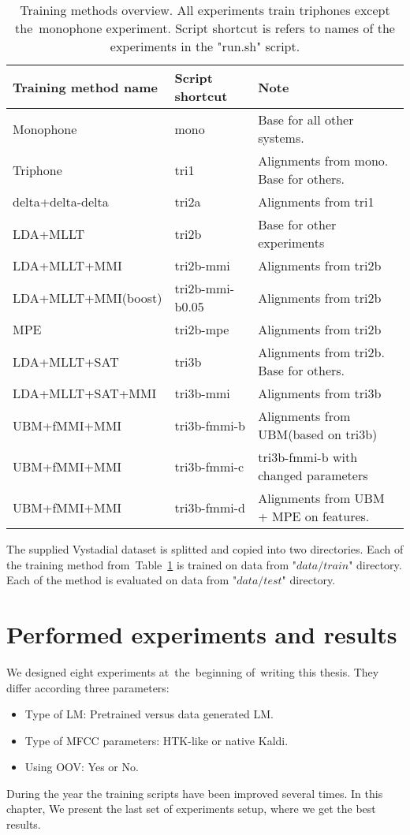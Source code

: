\begin{table}[!htp]\label{tab:disc_train}
\small{\begin{tabular}{lll}
\hline
Training method name & Script shortcut & Note\\
\hline
Monophone & mono & Base for all other systems.\\
Triphone  & tri1 &  Alignments from mono. Base for others.\\
delta+delta-delta & tri2a & Alignments from tri1 \\
\ac{LDA}+\ac{MLLT} & tri2b &  Base for other experiments \\
\ac{LDA}+\ac{MLLT}+\ac{MMI} & tri2b-mmi & Alignments from tri2b \\
\ac{LDA}+\ac{MLLT}+\ac{MMI}(boost) & tri2b-mmi-b0.05  & Alignments from tri2b \\
\ac{MPE} & tri2b-mpe & Alignments from tri2b \\
\ac{LDA}+\ac{MLLT}+\ac{SAT} & tri3b & Alignments from tri2b. Base for others. \\
\ac{LDA}+\ac{MLLT}+\ac{SAT}+\ac{MMI} & tri3b-mmi  & Alignments from tri3b \\
\ac{UBM}+\ac{fMMI}+\ac{MMI} & tri3b-fmmi-b & Alignments from \ac{UBM}(based on tri3b) \\
\ac{UBM}+\ac{fMMI}+\ac{MMI} & tri3b-fmmi-c & tri3b-fmmi-b with changed parameters \\
\ac{UBM}+\ac{fMMI}+\ac{MMI} & tri3b-fmmi-d & Alignments from \ac{UBM} + \ac{MPE} on features.\\ 
\end{tabular}}
\caption{Training methods overview. All experiments train triphones except the~monophone experiment. Script shortcut is refers to names of the experiments in the "run.sh" script.}
\end{table}

The supplied Vystadial dataset is splitted and copied into two directories.
Each of the training method from~Table~\ref{tab:disc_train} is trained on data from "$data/train$" directory.
Each of the method is evaluated on data from "$data/test$" directory.

\section{Performed experiments and results} 
\label{sec:exps}
We designed eight experiments at~the~beginning of~writing this thesis.
They differ according three parameters:
\begin{itemize}
    \item Type of \ac{LM}: Pretrained versus data generated \ac{LM}.
    \item Type of \ac{MFCC} parameters: \ac{HTK}-like or native Kaldi.
    \item Using \ac{OOV}: Yes or No.
\end{itemize}
During the year the training scripts have been improved several times. 
In this chapter, We present the last set of experiments setup, where we get the best results.

